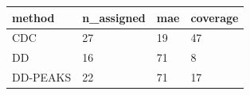 \begin{tabular}{llll}
\toprule
method & n_assigned & mae & coverage \\
\midrule
CDC & 27 & 19 & 47 \\
DD & 16 & 71 & 8 \\
DD-PEAKS & 22 & 71 & 17 \\
\bottomrule
\end{tabular}

